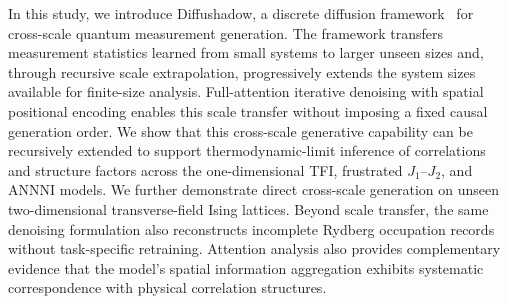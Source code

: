 \documentclass[pdflatex,sn-nature]{sn-jnl}%
\theoremstyle{thmstyleone}%
\theoremstyle{thmstyletwo}%
\theoremstyle{thmstylethree}%
\begin{document}
In this study, we introduce Diffushadow, a discrete diffusion framework~\cite{ho2020denoising,austin2021structured,nie2026large} for cross-scale quantum measurement generation. The framework transfers measurement statistics learned from small systems to larger unseen sizes and, through recursive scale extrapolation, progressively extends the system sizes available for finite-size analysis. Full-attention iterative denoising with spatial positional encoding enables this scale transfer without imposing a fixed causal generation order. We show that this cross-scale generative capability can be recursively extended to support thermodynamic-limit inference of correlations and structure factors across the one-dimensional TFI, frustrated $J_1$--$J_2$, and ANNNI models. We further demonstrate direct cross-scale generation on unseen two-dimensional transverse-field Ising lattices. Beyond scale transfer, the same denoising formulation also reconstructs incomplete Rydberg occupation records without task-specific retraining. Attention analysis also provides complementary evidence that the model's spatial information aggregation exhibits systematic correspondence with physical correlation structures.


\end{document}
